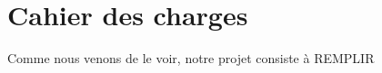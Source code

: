 \chapter{Cahier des charges}
\minitoc

Comme nous venons de le voir, notre projet consiste à REMPLIR


